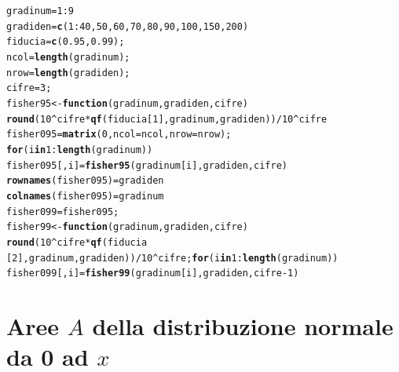 \documentclass[onecolumn,12pt]{book}\usepackage[]{graphicx}\usepackage[]{color}
\makeatletter
\newcommand{\hlnum}[1]{\textcolor[rgb]{0.686,0.059,0.569}{#1}}%
\newcommand{\hlopt}[1]{\textcolor[rgb]{0,0,0}{#1}}%
\newcommand{\hlstd}[1]{\textcolor[rgb]{0.345,0.345,0.345}{#1}}%
\newcommand{\hlkwa}[1]{\textcolor[rgb]{0.161,0.373,0.58}{\textbf{#1}}}%
\newcommand{\hlkwb}[1]{\textcolor[rgb]{0.69,0.353,0.396}{#1}}%
\newcommand{\hlkwc}[1]{\textcolor[rgb]{0.333,0.667,0.333}{#1}}%
\newcommand{\hlkwd}[1]{\textcolor[rgb]{0.737,0.353,0.396}{\textbf{#1}}}%
\newenvironment{kframe}{%
 \def\at@end@of@kframe{}%
 \ifinner\ifhmode%
  \def\at@end@of@kframe{\end{minipage}}%
  \begin{minipage}{\columnwidth}%
 \fi\fi%
 \def\FrameCommand##1{\hskip\@totalleftmargin \hskip-\fboxsep
 \colorbox{shadecolor}{##1}\hskip-\fboxsep
     \hskip-\linewidth \hskip-\@totalleftmargin \hskip\columnwidth}%
 \MakeFramed {\advance\hsize-\width
   \@totalleftmargin\z@ \linewidth\hsize
   \@setminipage}}%
 {\par\unskip\endMakeFramed%
 \at@end@of@kframe}
\newenvironment{knitrout}{}{} %
\makeatother
\begin{document}
\begin{knitrout}
\color{fgcolor}\begin{kframe}
\begin{alltt}
\hlstd{gradinum}\hlkwb{=}\hlnum{1}\hlopt{:}\hlnum{9}
\hlstd{gradiden}\hlkwb{=}\hlkwd{c}\hlstd{(}\hlnum{1}\hlopt{:}\hlnum{40}\hlstd{,}\hlnum{50}\hlstd{,}\hlnum{60}\hlstd{,}\hlnum{70}\hlstd{,}\hlnum{80}\hlstd{,}\hlnum{90}\hlstd{,}\hlnum{100}\hlstd{,}\hlnum{150}\hlstd{,}\hlnum{200}\hlstd{)}
\hlstd{fiducia}\hlkwb{=}\hlkwd{c}\hlstd{(}\hlnum{0.95}\hlstd{,}\hlnum{0.99}\hlstd{);}
\hlstd{ncol}\hlkwb{=}\hlkwd{length}\hlstd{(gradinum);}
\hlstd{nrow}\hlkwb{=}\hlkwd{length}\hlstd{(gradiden);}
\hlstd{cifre}\hlkwb{=}\hlnum{3}\hlstd{;}
\hlstd{fisher95}\hlkwb{<-}\hlkwa{function}\hlstd{(}\hlkwc{gradinum}\hlstd{,}\hlkwc{gradiden}\hlstd{,}\hlkwc{cifre}\hlstd{)}
\hlkwd{round}\hlstd{(}\hlnum{10}\hlopt{^}\hlstd{cifre}\hlopt{*}\hlkwd{qf}\hlstd{(fiducia[}\hlnum{1}\hlstd{],gradinum,gradiden))}\hlopt{/}\hlnum{10}\hlopt{^}\hlstd{cifre}
\hlstd{fisher095}\hlkwb{=}\hlkwd{matrix}\hlstd{(}\hlnum{0}\hlstd{,}\hlkwc{ncol}\hlstd{=ncol,}\hlkwc{nrow}\hlstd{=nrow);}
\hlkwa{for} \hlstd{(i} \hlkwa{in} \hlnum{1}\hlopt{:}\hlkwd{length}\hlstd{(gradinum))}
\hlstd{fisher095[,i]}\hlkwb{=} \hlkwd{fisher95}\hlstd{(gradinum[i],gradiden,cifre)}
 \hlkwd{rownames}\hlstd{(fisher095)}\hlkwb{=}\hlstd{gradiden}
\hlkwd{colnames}\hlstd{(fisher095)}\hlkwb{=}\hlstd{gradinum}
\hlstd{fisher099}\hlkwb{=}\hlstd{fisher095;}
\hlstd{fisher99}\hlkwb{<-}\hlkwa{function}\hlstd{(}\hlkwc{gradinum}\hlstd{,}\hlkwc{gradiden}\hlstd{,}\hlkwc{cifre}\hlstd{)}
\hlkwd{round}\hlstd{(}\hlnum{10}\hlopt{^}\hlstd{cifre}\hlopt{*}\hlkwd{qf}\hlstd{(fiducia}
\hlstd{[}\hlnum{2}\hlstd{],gradinum,gradiden))}\hlopt{/}\hlnum{10}\hlopt{^}\hlstd{cifre;}\hlkwa{for} \hlstd{(i} \hlkwa{in} \hlnum{1}\hlopt{:}\hlkwd{length}\hlstd{(gradinum))}
\hlstd{fisher099[,i]}\hlkwb{=} \hlkwd{fisher99}\hlstd{(gradinum[i],gradiden,cifre}\hlopt{-}\hlnum{1}\hlstd{)}
\end{alltt}
\end{kframe}
\end{knitrout}
 \setlength\textheight{9in}
\vfill\eject
\section*{Aree $A$  della distribuzione normale da 0 ad $x$}
\oddsidemargin  0.0in
\evensidemargin 0.0in
\topmargin -0.4in
\small
\end{document}
